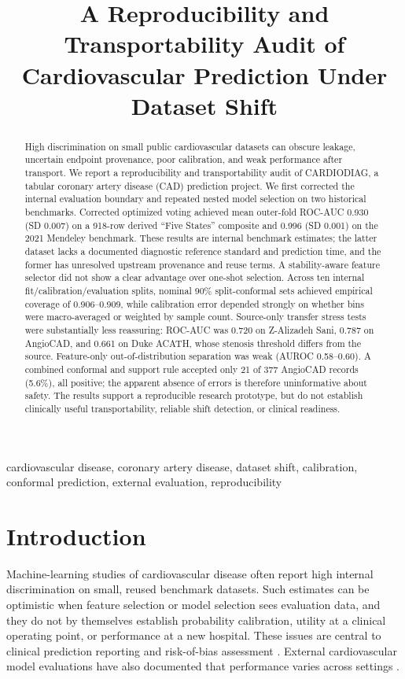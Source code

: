 \documentclass[conference]{IEEEtran}
\title{A Reproducibility and Transportability Audit of Cardiovascular Prediction Under Dataset Shift}
\author{\IEEEauthorblockN{Akhil Preetham E, Ch Hari Krishna, and G Vennela}
\IEEEauthorblockA{Department of Computer Science and Engineering\\
Prasad V. Potluri Siddhartha Institute of Technology, Vijayawada, India\\
\textit{Working draft; author order, contributions, and affiliations require confirmation before submission}}}
\begin{document}
\maketitle

\begin{abstract}
High discrimination on small public cardiovascular datasets can obscure leakage, uncertain endpoint provenance, poor calibration, and weak performance after transport. We report a reproducibility and transportability audit of CARDIODIAG, a tabular coronary artery disease (CAD) prediction project. We first corrected the internal evaluation boundary and repeated nested model selection on two historical benchmarks. Corrected optimized voting achieved mean outer-fold ROC-AUC 0.930 (SD 0.007) on a 918-row derived ``Five States'' composite and 0.996 (SD 0.001) on the 2021 Mendeley benchmark. These results are internal benchmark estimates; the latter dataset lacks a documented diagnostic reference standard and prediction time, and the former has unresolved upstream provenance and reuse terms. A stability-aware feature selector did not show a clear advantage over one-shot selection. Across ten internal fit/calibration/evaluation splits, nominal 90\% split-conformal sets achieved empirical coverage of 0.906--0.909, while calibration error depended strongly on whether bins were macro-averaged or weighted by sample count. Source-only transfer stress tests were substantially less reassuring: ROC-AUC was 0.720 on Z-Alizadeh Sani, 0.787 on AngioCAD, and 0.661 on Duke ACATH, whose stenosis threshold differs from the source. Feature-only out-of-distribution separation was weak (AUROC 0.58--0.60). A combined conformal and support rule accepted only 21 of 377 AngioCAD records (5.6\%), all positive; the apparent absence of errors is therefore uninformative about safety. The results support a reproducible research prototype, but do not establish clinically useful transportability, reliable shift detection, or clinical readiness.
\end{abstract}
\begin{IEEEkeywords}
cardiovascular disease, coronary artery disease, dataset shift, calibration, conformal prediction, external evaluation, reproducibility
\end{IEEEkeywords}

\section{Introduction}
Machine-learning studies of cardiovascular disease often report high internal discrimination on small, reused benchmark datasets. Such estimates can be optimistic when feature selection or model selection sees evaluation data, and they do not by themselves establish probability calibration, utility at a clinical operating point, or performance at a new hospital. These issues are central to clinical prediction reporting and risk-of-bias assessment \cite{collins2024tripodai,moons2025probastai}. External cardiovascular model evaluations have also documented that performance varies across settings \cite{wessler2021external}.
\end{document}
